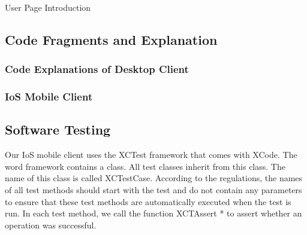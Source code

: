 \noindent User Page Introduction



\subsection{Code Fragments and Explanation}
\subsubsection{Code Explanations of Desktop Client}



\subsubsection{IoS Mobile Client}

\subsection{Software Testing}


\noindent Our IoS mobile client uses the XCTest framework that comes with XCode. The word framework contains a class. All test classes inherit from this class. The name of this class is called XCTestCase. According to the regulations, the names of all test methods should start with the test and do not contain any parameters to ensure that these test methods are automatically executed when the test is run. In each test method, we call the function XCTAssert * to assert whether an operation was successful.